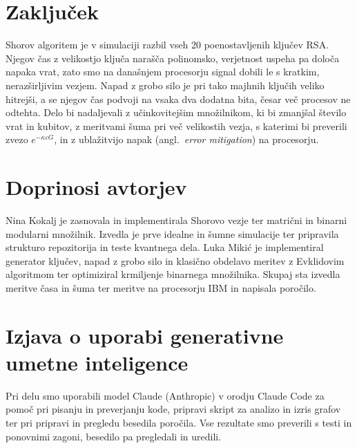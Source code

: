 \section{Zaključek}
\label{g29:sec:zakljucek}

Shorov algoritem je v simulaciji razbil vseh 20 poenostavljenih ključev RSA. Njegov čas z velikostjo ključa narašča polinomsko, verjetnost uspeha pa določa napaka vrat, zato smo na današnjem procesorju signal dobili le s kratkim, nerazširljivim vezjem. Napad z grobo silo je pri tako majhnih ključih veliko hitrejši, a se njegov čas podvoji na vsaka dva dodatna bita, česar več procesov ne odtehta. Delo bi nadaljevali z učinkovitejšim množilnikom, ki bi zmanjšal število vrat in kubitov, z meritvami šuma pri več velikostih vezja, s katerimi bi preverili zvezo $e^{-\kappa\varepsilon G}$, in z ublažitvijo napak (angl.\ \emph{error mitigation}) na procesorju.


\section*{Doprinosi avtorjev}

Nina Kokalj je zasnovala in implementirala Shorovo vezje ter matrični in binarni modularni množilnik. Izvedla je prve idealne in šumne simulacije ter pripravila strukturo repozitorija in teste kvantnega dela. Luka Mikić je implementiral generator ključev, napad z grobo silo in klasično obdelavo meritev z Evklidovim algoritmom ter optimiziral krmiljenje binarnega množilnika. Skupaj sta izvedla meritve časa in šuma ter meritve na procesorju IBM in napisala poročilo.

\section*{Izjava o uporabi generativne umetne inteligence}

Pri delu smo uporabili model Claude (Anthropic) v orodju Claude Code za pomoč pri pisanju in preverjanju kode, pripravi skript za analizo in izris grafov ter pri pripravi in pregledu besedila poročila. Vse rezultate smo preverili s testi in ponovnimi zagoni, besedilo pa pregledali in uredili.

